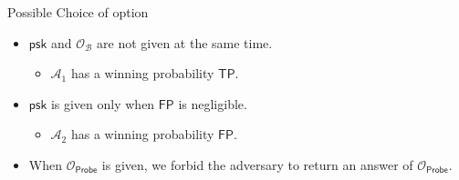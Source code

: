 
\begin{frame}{Possible Choice of \textsf{option}}

\begin{itemize}

	\item $\textsf{psk}$ and $\mathcal{O}_{\mathcal{B}}$ are not given at the same time.

	\begin{itemize}
		\item<2-> $\mathcal{A}_1$ has a winning probability $\textsf{TP}$.
	\end{itemize}

	\item<3-> $\textsf{psk}$ is given only when $\textsf{FP}$ is negligible.
	\begin{itemize}
		\item<4-> $\mathcal{A}_2$ has a winning probability $\textsf{FP}$.
	\end{itemize}

	\item<5-> When $\mathcal{O}_{\textsf{Probe}}$ is given, we forbid the adversary to return an answer of $\mathcal{O}_{\textsf{Probe}}$.

\end{itemize}

\begin{columns}

\end{columns}
\end{frame}
